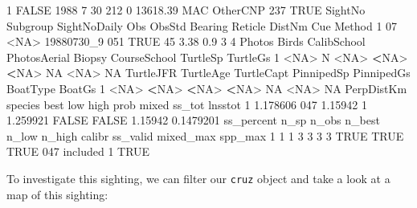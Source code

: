 \documentclass[
]{book}
\newenvironment{Shaded}{\begin{snugshade}}{\end{snugshade}}
\newcommand{\ConstantTok}[1]{\textcolor[rgb]{0.00,0.00,0.00}{#1}}
\newcommand{\DecValTok}[1]{\textcolor[rgb]{0.00,0.00,0.81}{#1}}
\newcommand{\ErrorTok}[1]{\textcolor[rgb]{0.64,0.00,0.00}{\textbf{#1}}}
\newcommand{\FloatTok}[1]{\textcolor[rgb]{0.00,0.00,0.81}{#1}}
\newcommand{\NormalTok}[1]{#1}
\newcommand{\SpecialCharTok}[1]{\textcolor[rgb]{0.00,0.00,0.00}{#1}}
\begin{document}
\begin{Shaded}
\begin{Highlighting}[]
\DecValTok{1}           \ConstantTok{FALSE} \DecValTok{1988}     \DecValTok{7}  \DecValTok{30}  \DecValTok{212}      \DecValTok{0} \FloatTok{13618.39}\NormalTok{  MAC OtherCNP    }\DecValTok{237} \ConstantTok{TRUE}
\NormalTok{  SightNo Subgroup SightNoDaily Obs ObsStd Bearing Reticle DistNm Cue Method}
\DecValTok{1}      \DecValTok{07}     \SpecialCharTok{\textless{}}\ConstantTok{NA}\SpecialCharTok{\textgreater{}}\NormalTok{   19880730\_9 }\DecValTok{051}   \ConstantTok{TRUE}      \DecValTok{45}    \FloatTok{3.38}    \FloatTok{0.9}   \DecValTok{3}      \DecValTok{4}
\NormalTok{  Photos Birds CalibSchool PhotosAerial Biopsy CourseSchool TurtleSp TurtleGs}
\DecValTok{1}   \SpecialCharTok{\textless{}}\ConstantTok{NA}\SpecialCharTok{\textgreater{}}\NormalTok{     N        }\SpecialCharTok{\textless{}}\ConstantTok{NA}\SpecialCharTok{\textgreater{}}         \ErrorTok{\textless{}}\ConstantTok{NA}\SpecialCharTok{\textgreater{}}   \ErrorTok{\textless{}}\ConstantTok{NA}\SpecialCharTok{\textgreater{}}           \ConstantTok{NA}     \SpecialCharTok{\textless{}}\ConstantTok{NA}\SpecialCharTok{\textgreater{}}       \ConstantTok{NA}
\NormalTok{  TurtleJFR TurtleAge TurtleCapt PinnipedSp PinnipedGs BoatType BoatGs}
\DecValTok{1}      \SpecialCharTok{\textless{}}\ConstantTok{NA}\SpecialCharTok{\textgreater{}}      \ErrorTok{\textless{}}\ConstantTok{NA}\SpecialCharTok{\textgreater{}}       \ErrorTok{\textless{}}\ConstantTok{NA}\SpecialCharTok{\textgreater{}}       \ErrorTok{\textless{}}\ConstantTok{NA}\SpecialCharTok{\textgreater{}}         \ConstantTok{NA}     \SpecialCharTok{\textless{}}\ConstantTok{NA}\SpecialCharTok{\textgreater{}}     \ConstantTok{NA}
\NormalTok{  PerpDistKm species    best low     high  prob mixed  ss\_tot   lnsstot}
\DecValTok{1}   \FloatTok{1.178606}     \DecValTok{047} \FloatTok{1.15942}   \DecValTok{1} \FloatTok{1.259921} \ConstantTok{FALSE} \ConstantTok{FALSE} \FloatTok{1.15942} \FloatTok{0.1479201}
\NormalTok{  ss\_percent n\_sp n\_obs n\_best n\_low n\_high calibr ss\_valid mixed\_max spp\_max}
\DecValTok{1}          \DecValTok{1}    \DecValTok{1}     \DecValTok{3}      \DecValTok{3}     \DecValTok{3}      \DecValTok{3}   \ConstantTok{TRUE}     \ConstantTok{TRUE}      \ConstantTok{TRUE}     \DecValTok{047}
\NormalTok{  included}
\DecValTok{1}     \ConstantTok{TRUE}
\end{Highlighting}
\end{Shaded}

To investigate this sighting, we can filter our \texttt{cruz} object and take a look at a map of this sighting:
\end{document}
